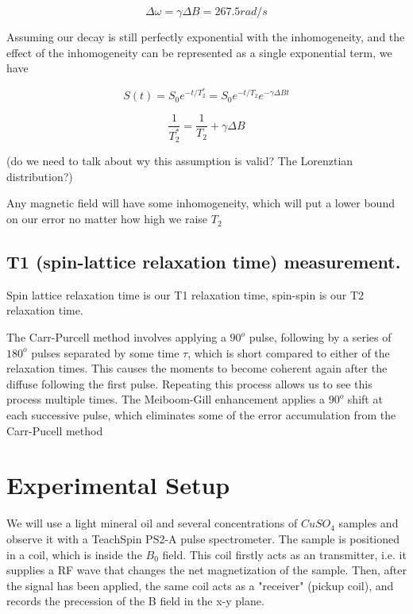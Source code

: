 \documentclass[12pt]{article}
\begin{document}
\[\Delta \omega = \gamma \Delta B = 267.5 rad/s\]

Assuming our decay is still perfectly exponential with the inhomogeneity, and the effect of the inhomogeneity can be represented as a single exponential term, we have

\[S(t)=S_0e^{-t/T_2^*} = S_0e^{-t/T_2}e^{-\gamma \Delta B t}\]

\[\frac{1}{T_2^*} = \frac{1}{T_2} + \gamma \Delta B\]

(do we need to talk about wy this assumption is valid? The Lorenztian distribution?)

Any magnetic field will have some inhomogeneity, which will put a lower bound on our error no matter how high we raise $T_2$

\subsection{T1 (spin-lattice relaxation time) measurement.}

Spin lattice relaxation time is our T1 relaxation time, spin-spin is our T2 relaxation time.

The Carr-Purcell method involves applying a $90^o$ pulse, following by a series of $180^o$ pulses separated by some time $\tau$, which is short compared to either of the relaxation times. This causes the moments to become coherent again after the diffuse following the first pulse. Repeating this process allows us to see this process multiple times. The Meiboom-Gill enhancement applies a $90^o$ shift at each successive pulse, which eliminates some of the error accumulation from the Carr-Pucell method


\section{ Experimental Setup}

We will use a light mineral oil and several concentrations of $CuSO_4$ samples and observe it with a TeachSpin PS2-A pulse spectrometer.
The sample is positioned in a coil, which is inside the $B_0$ field. This coil firstly acts as an transmitter, i.e. it supplies a RF wave that changes the net magnetization of the sample. Then, after the signal has been applied, the same coil acts as a "receiver" (pickup coil), and records the precession of the B field in the x-y plane.
\end{document}
